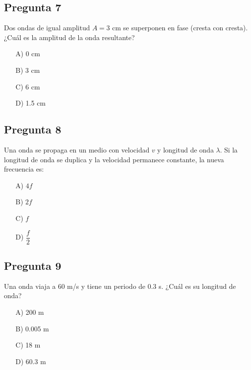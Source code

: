 \begin{preguntabox}
\subsection*{Pregunta 7}
Dos ondas de igual amplitud $A = 3$ cm se superponen en fase (cresta con cresta). ¿Cuál es la amplitud de la onda resultante?

\begin{enumerate}
    \item[A)] 0 cm
    \item[B)] 3 cm
    \item[C)] 6 cm
    \item[D)] 1.5 cm
\end{enumerate}
\end{preguntabox}

\begin{preguntabox}
\subsection*{Pregunta 8}
Una onda se propaga en un medio con velocidad $v$ y longitud de onda $\lambda$. Si la longitud de onda se duplica y la velocidad permanece constante, la nueva frecuencia es:

\begin{enumerate}
    \item[A)] $4f$
    \item[B)] $2f$
    \item[C)] $f$
    \item[D)] $\dfrac{f}{2}$
\end{enumerate}
\end{preguntabox}

\begin{preguntabox}
\subsection*{Pregunta 9}
Una onda viaja a 60 m/s y tiene un periodo de 0.3 s. ¿Cuál es su longitud de onda?

\begin{enumerate}
    \item[A)] 200 m
    \item[B)] 0.005 m
    \item[C)] 18 m
    \item[D)] 60.3 m
\end{enumerate}
\end{preguntabox}

